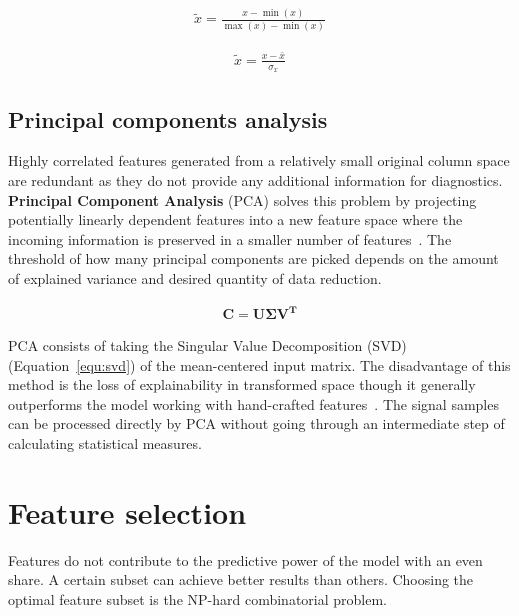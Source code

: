 \begin{ceqn}\begin{align}
\widetilde{x} = \frac{x - \min(x)}{\max(x) - \min(x)}
\label{equ:min-max-scaler}
\end{align}\end{ceqn}

\begin{ceqn}\begin{align}
\widetilde{x} = \frac{x - \bar{x}}{\sigma_x}
\label{equ:standardization-scaler}
\end{align}\end{ceqn}


\subsection{Principal components analysis}
Highly correlated features generated from a relatively small original column space are redundant as they do not provide any additional information for diagnostics. \textbf{Principal Component Analysis} (PCA) solves this problem by projecting potentially linearly dependent features into a new feature space where the incoming information is preserved in a smaller number of features~\cite{zheng_feature_2018}. The threshold of how many principal components are picked depends on the amount of explained variance and desired quantity of data reduction.

\begin{ceqn}\begin{align}
\mathbf{C} = \mathbf{U \Sigma V^T}
\label{equ:svd}
\end{align}\end{ceqn}

PCA consists of taking the Singular Value Decomposition (SVD) (Equation~\ref{equ:svd}) of the mean-centered input matrix. The disadvantage of this method is the loss of explainability in transformed space though it generally outperforms the model working with hand-crafted features~\cite{brito_fault_2021}. The signal samples can be processed directly by PCA without going through an intermediate step of calculating statistical measures. 

\section{Feature selection}
Features do not contribute to the predictive power of the model with an even share. A certain subset can achieve better results than others. Choosing the optimal feature subset is the NP-hard combinatorial problem.

